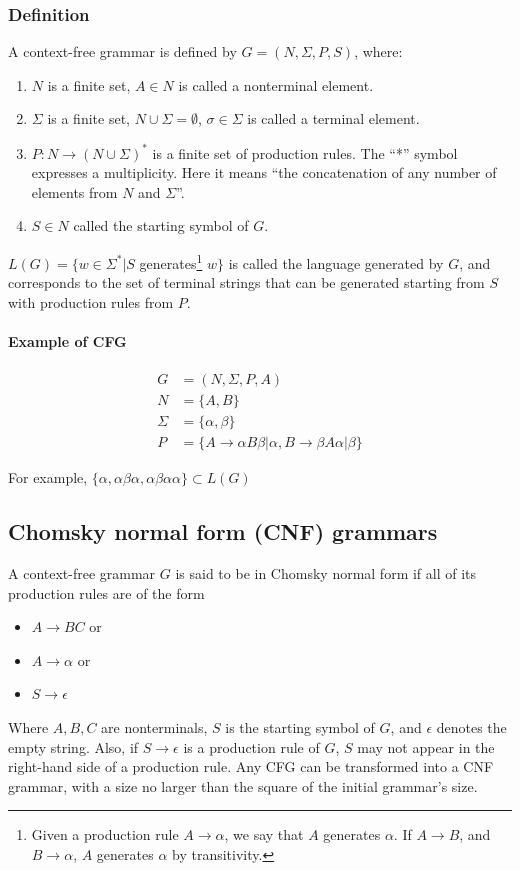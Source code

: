 \documentclass[]{article}
\begin{document}
\begin{multicols}{2}
\subsubsection{Definition}
A context-free grammar is defined by $G=(N,\Sigma,P,S)$, where:\\
\begin{enumerate}
  \item $N$ is a finite set, $A\in N$ is called a nonterminal element.
  \item $\Sigma$ is a finite set, $N\cup\Sigma=\emptyset$, $\sigma\in\Sigma$ is called a terminal element.
  \item $P:N\rightarrow (N\cup \Sigma)^*$ is a finite set of production rules.
    The ``*'' symbol expresses a multiplicity. Here it means ``the concatenation
    of any number of elements from $N$ and $\Sigma$''.
  \item $S\in N$ called the starting symbol of $G$.
\end{enumerate}
$L(G)=\{w\in \Sigma^*|S$ generates\footnote{Given a production rule
  $A\rightarrow \alpha$, we say that $A$ generates $\alpha$. If $A\rightarrow
  B$, and $B\rightarrow\alpha$, $A$ generates $\alpha$ by transitivity.} $w\}$
is called the language generated by $G$, and corresponds to the set of
terminal strings that can be generated starting from $S$ with production rules
from $P$.

\paragraph{Example of CFG} 
\begin{align*}
  G&=(N,\Sigma,P,A)\\
  N&=\{A,B\}\\
  \Sigma&=\{\alpha,\beta\}\\
  P&=\{A\rightarrow\alpha B\beta | \alpha, B\rightarrow\beta A\alpha | \beta\}
\end{align*}

For example, $\{\alpha, \alpha\beta\alpha, \alpha\beta\alpha\alpha\}\subset L(G)$


\subsection{Chomsky normal form (CNF) grammars}
A context-free grammar $G$ is said to be in Chomsky normal form if all of its production rules are of the form
\begin{itemize}
\item $A\rightarrow BC$ or
\item $A\rightarrow\alpha$ or
\item $S\rightarrow\epsilon$
\end{itemize}
Where $A,B,C$ are nonterminals, $S$ is the starting symbol of $G$, and $\epsilon$
denotes the empty string. Also,  if $S\rightarrow\epsilon$ is a production
rule of $G$, $S$ may not appear in the right-hand side of a production rule.
Any CFG can be transformed into a CNF grammar, with a size no larger than the square of the initial grammar's size.


\end{multicols}
\end{document}
